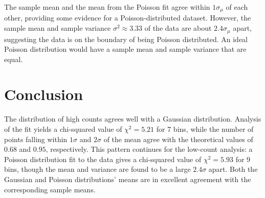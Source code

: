\documentclass[11pt]{article}
\begin{document}
\vspace{1em}

The sample mean and the mean from the Poisson fit agree within $1
\sigma_{\mu}$ of
each other, providing some evidence for a Poisson-distributed
dataset. However, the sample mean and sample variance $\sigma^2
\approx 3.33$ of the data are about $2.4\sigma_{\mu}$ apart,
suggesting the data is on the boundary of being Poisson distributed. An ideal
Poisson distribution would have a sample mean and sample variance
that are equal.

\section{Conclusion}

The distribution of high counts agrees well with a Gaussian
distribution. Analysis of the fit yields a chi-squared value of
$\chi^2 = 5.21$ for 7 bins, while the number of points falling within
$1\sigma$ and $2 \sigma$ of the mean agree with the theoretical values
of $0.68$ and $0.95$, respectively. This pattern continues for the low-count
analysis: a Poisson distribution fit to the data gives a chi-squared value of
$\chi^2 = 5.93$ for 9 bins, though the mean and variance are found to
be a large $2.4 \sigma$ apart. Both the Gaussian and Poisson
distributions' means are in excellent agreement with the
corresponding sample means.
\end{document}
